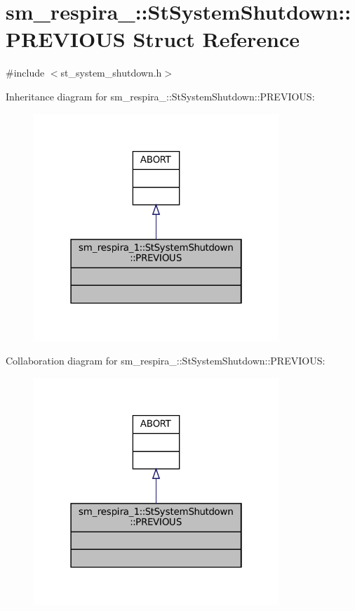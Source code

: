 \hypertarget{structsm__respira__1_1_1StSystemShutdown_1_1PREVIOUS}{}\section{sm\+\_\+respira\+\_\+:\+:St\+System\+Shutdown\+:\+:P\+R\+E\+V\+I\+O\+US Struct Reference}
\label{structsm__respira__1_1_1StSystemShutdown_1_1PREVIOUS}


{\ttfamily \#include $<$st\+\_\+system\+\_\+shutdown.\+h$>$}



Inheritance diagram for sm\+\_\+respira\+\_\+:\+:St\+System\+Shutdown\+:\+:P\+R\+E\+V\+I\+O\+US\+:
\nopagebreak
\begin{figure}[H]
\begin{center}
\leavevmode
\includegraphics[width=262pt]{structsm__respira__1_1_1StSystemShutdown_1_1PREVIOUS__inherit__graph}
\end{center}
\end{figure}


Collaboration diagram for sm\+\_\+respira\+\_\+:\+:St\+System\+Shutdown\+:\+:P\+R\+E\+V\+I\+O\+US\+:
\nopagebreak
\begin{figure}[H]
\begin{center}
\leavevmode
\includegraphics[width=262pt]{structsm__respira__1_1_1StSystemShutdown_1_1PREVIOUS__coll__graph}
\end{center}
\end{figure}



